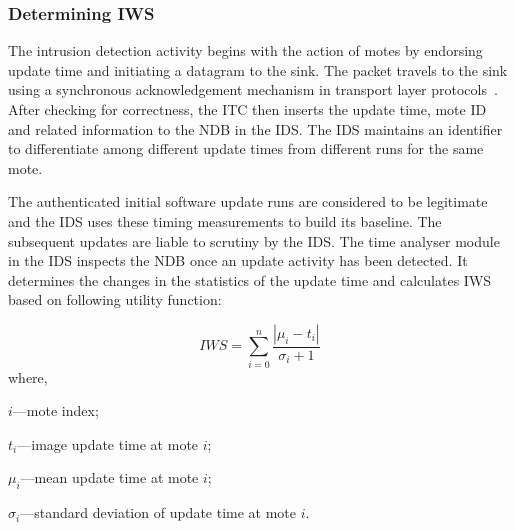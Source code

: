 \documentclass[conference,manuscript]{IEEEtran}
\newcommand{\notedme}[1]{\raisebox{0pt}[0pt][0pt]{\pdfcomment[open=true,color=blue]{#1}}}
\begin{document}
\subsubsection*{Determining IWS}
\label{ssc:cal_iws}
The intrusion detection activity begins with the action of motes by endorsing update time and initiating a datagram to the sink. 
The packet travels to the sink using a synchronous acknowledgement mechanism in transport layer protocols~\cite{tep116}.
After checking for correctness, the ITC then inserts the update time, mote ID and related information to the NDB in the IDS.
The IDS maintains an identifier to differentiate among different update times from different runs for the same mote.
%

The authenticated initial software update runs are considered to be legitimate and the IDS uses these timing measurements to build its baseline.
The subsequent updates are liable to scrutiny by the IDS.
The time analyser module in the IDS inspects the NDB once an update activity has been detected.
It determines the changes in the statistics of the update time and calculates IWS based on following utility function:

\begin{equation}
\label{eqn2} 
	\mathit{IWS} = \sum \limits_{i=0}^{n} \frac{\left| \mu_i - t_i \right|}{\sigma_i + 1}
\end{equation}
where, 
\begin{inparaenum}
\item $\mathit{i}$---mote index;%
\item $\mathit{t_i}$---image update time at mote $\mathit{i}$;  
\item $\mathit{\mu_i}$---mean update time at mote $\mathit{i}$;  
\item $\mathit{\sigma_i}$---standard deviation of update time at mote $\mathit{i}$. 
\end{inparaenum}	
\end{document}
